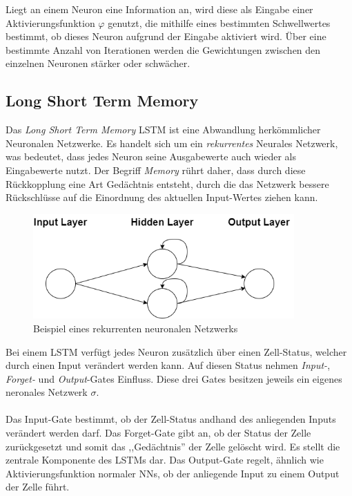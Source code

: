 Liegt an einem Neuron eine Information an, wird diese als Eingabe einer Aktivierungsfunktion $\varphi$ genutzt, 
die mithilfe eines bestimmten Schwellwertes bestimmt, ob dieses Neuron aufgrund der Eingabe aktiviert wird. Über eine 
bestimmte Anzahl von Iterationen werden die Gewichtungen zwischen den einzelnen Neuronen stärker oder schwächer.


\subsection{Long Short Term Memory}
Das \textit{Long Short Term Memory} LSTM ist eine Abwandlung herkömmlicher Neuronalen Netzwerke. Es handelt sich um ein
\textit{rekurrentes} Neurales Netzwerk, was bedeutet, dass jedes Neuron seine Ausgabewerte auch wieder als Eingabewerte
nutzt. Der Begriff \textit{Memory} rührt daher, dass durch diese Rückkopplung eine Art Gedächtnis entsteht, durch 
die das Netzwerk bessere Rückschlüsse auf die Einordnung des aktuellen Input-Wertes ziehen kann.\\

\begin{figure}[h]
    \centering
    \includegraphics[width=10.0cm]{pic/RecurrentNN.png}
    \caption{Beispiel eines rekurrenten neuronalen Netzwerks}
    \label{fig:RecNN}
\end{figure}

\newpage
Bei einem LSTM verfügt jedes Neuron zusätzlich über einen Zell-Status, welcher durch einen Input verändert werden kann.
Auf diesen Status nehmen \textit{Input-}, \textit{Forget-} und \textit{Output}-Gates Einfluss. Diese drei Gates
besitzen jeweils ein eigenes neronales Netzwerk $\sigma$.\\\\
Das Input-Gate bestimmt, ob der Zell-Status andhand des anliegenden Inputs verändert werden darf.
Das Forget-Gate gibt an, ob der Status der Zelle zurückgesetzt und somit das ,,Gedächtnis'' der Zelle gelöscht wird. Es
stellt die zentrale Komponente des LSTMs dar.
Das Output-Gate regelt, ähnlich wie Aktivierungsfunktion normaler NNs, ob der anliegende Input zu einem Output 
der Zelle führt.

